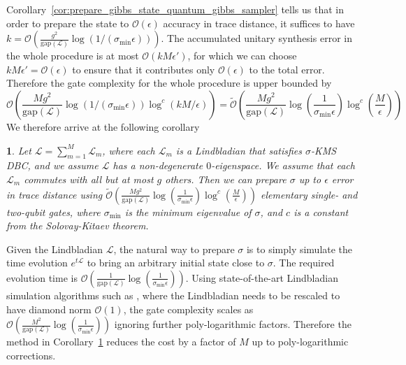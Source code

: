 \documentclass{article}
\theoremstyle{plain}
\theoremstyle{plain}
\theoremstyle{plain}
\theoremstyle{plain}
\theoremstyle{plain}
\theoremstyle{plain}
\newtheorem{cor}{\protect\corollaryname}
\theoremstyle{plain}
\providecommand{\corollaryname}{Corollary}
\newcommand{\wt}{\widetilde}
\newcommand{\Or}{\mathcal{O}}
\begin{document}
Corollary~\ref{cor:prepare_gibbs_state_quantum_gibbs_sampler} tells us that in order to prepare the state to $\Or(\epsilon)$ accuracy in trace distance, it suffices to have $k=\Or(\frac{g^2}{\mathrm{gap}(\mathcal{L})}\log(1/(\sigma_{\min}\epsilon)))$. The accumulated unitary synthesis error in the whole procedure is at most $\Or(kM\epsilon')$, for which we can choose $kM\epsilon'=\Or(\epsilon)$ to ensure that it contributes only $\Or(\epsilon)$ to the total error. Therefore the gate complexity for the whole procedure is upper bounded by
\begin{equation}
    \label{eq:gate_complexity_cyclic}
    \Or\left(\frac{M g^2}{\mathrm{gap}(\mathcal{L})}\log(1/(\sigma_{\min}\epsilon))\log^c(kM/\epsilon)\right)=\wt{\Or}\left(\frac{M g^2}{\mathrm{gap}(\mathcal{L})}\log\left(\frac{1}{\sigma_{\min}\epsilon}\right)\log^c\left(\frac{M}{\epsilon}\right)\right)
\end{equation}
We therefore arrive at the following corollary
\begin{cor}
\label{cor:gate_complexity}
    Let $\mathcal{L}=\sum_{m=1}^M \mathcal{L}_m$, where each $\mathcal{L}_m$ is a Lindbladian that satisfies $\sigma$-KMS DBC, and we assume $\mathcal{L}$ has a non-degenerate $0$-eigenspace. We assume that each $\mathcal{L}_m$ commutes with all but at most $g$ others. Then we can prepare $\sigma$ up to $\epsilon$ error in trace distance using $\wt{\Or}\left(\frac{M g^2}{\mathrm{gap}(\mathcal{L})}\log\left(\frac{1}{\sigma_{\min}\epsilon}\right)\log^c\left(\frac{M}{\epsilon}\right)\right)$ elementary single- and two-qubit gates, where $\sigma_{\min}$ is the minimum eigenvalue of $\sigma$, and $c$ is a constant from the Solovay-Kitaev theorem.
\end{cor}

Given the Lindbladian $\mathcal{L}$, the natural way to prepare $\sigma$ is to simply simulate the time evolution $e^{t\mathcal{L}}$ to bring an arbitrary initial state close to $\sigma$. The required evolution time is $\Or(\frac{1}{\mathrm{gap}(\mathcal{L})}\log(\frac{1}{\sigma_{\min}\epsilon}))$. Using state-of-the-art Lindbladian simulation algorithms such as \cite{DingLiLin2024simulating}, where the Lindbladian needs to be rescaled to have diamond norm $\Or(1)$, the gate complexity scales as $\Or(\frac{M^2}{\mathrm{gap}(\mathcal{L})}\log(\frac{1}{\sigma_{\min}\epsilon}))$ ignoring further poly-logarithmic factors. Therefore the method in Corollary~\ref{cor:gate_complexity} reduces the cost by a factor of $M$ up to poly-logarithmic corrections.
\end{document}
